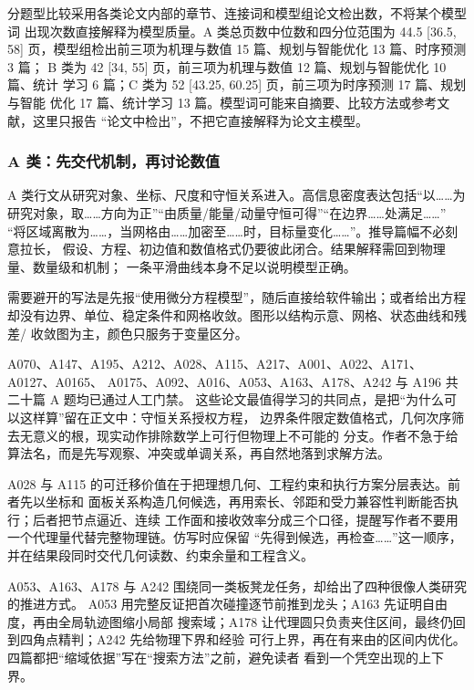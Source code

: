 \documentclass[UTF8,a4paper,12pt]{ctexart}
\begin{document}
分题型比较采用各类论文内部的章节、连接词和模型组论文检出数，不将某个模型词
出现次数直接解释为模型质量。A 类总页数中位数和四分位范围为 44.5 [36.5, 58]
页，模型组检出前三项为机理与数值 15 篇、规划与智能优化 13 篇、时序预测 3 篇；
B 类为 42 [34, 55] 页，前三项为机理与数值 12 篇、规划与智能优化 10 篇、统计
学习 6 篇；C 类为 52 [43.25, 60.25] 页，前三项为时序预测 17 篇、规划与智能
优化 17 篇、统计学习 13 篇。模型词可能来自摘要、比较方法或参考文献，这里只报告
“论文中检出”，不把它直接解释为论文主模型。

\subsubsection{A 类：先交代机制，再讨论数值}

A 类行文从研究对象、坐标、尺度和守恒关系进入。高信息密度表达包括“以……为
研究对象，取……方向为正”“由质量/能量/动量守恒可得”“在边界……处满足……”
“将区域离散为……，当网格由……加密至……时，目标量变化……”。推导篇幅不必刻意拉长，
假设、方程、初边值和数值格式仍要彼此闭合。结果解释需回到物理量、数量级和机制；
一条平滑曲线本身不足以说明模型正确。

需要避开的写法是先报“使用微分方程模型”，随后直接给软件输出；或者给出方程
却没有边界、单位、稳定条件和网格收敛。图形以结构示意、网格、状态曲线和残差/
收敛图为主，颜色只服务于变量区分。

A070、A147、A195、A212、A028、A115、A217、A001、A022、A171、A0127、A0165、
A0175、A092、A016、A053、A163、A178、A242 与 A196 共二十篇 A 题均已通过人工门禁。
这些论文最值得学习的共同点，是把“为什么可以这样算”留在正文中：守恒关系授权方程，
边界条件限定数值格式，几何次序筛去无意义的根，现实动作排除数学上可行但物理上不可能的
分支。作者不急于给算法名，而是先写观察、冲突或单调关系，再自然地落到求解方法。

A028 与 A115 的可迁移价值在于把理想几何、工程约束和执行方案分层表达。前者先以坐标和
面板关系构造几何候选，再用索长、邻距和受力兼容性判断能否执行；后者把节点逼近、连续
工作面和接收效率分成三个口径，提醒写作者不要用一个代理量代替完整物理链。仿写时应保留
“先得到候选，再检查……”这一顺序，并在结果段同时交代几何读数、约束余量和工程含义。

A053、A163、A178 与 A242 围绕同一类板凳龙任务，却给出了四种很像人类研究的推进方式。
A053 用完整反证把首次碰撞逐节前推到龙头；A163 先证明自由度，再由全局轨迹图缩小局部
搜索域；A178 让代理圆只负责夹住区间，最终仍回到四角点精判；A242 先给物理下界和经验
可行上界，再在有来由的区间内优化。四篇都把“缩域依据”写在“搜索方法”之前，避免读者
看到一个凭空出现的上下界。
\end{document}
